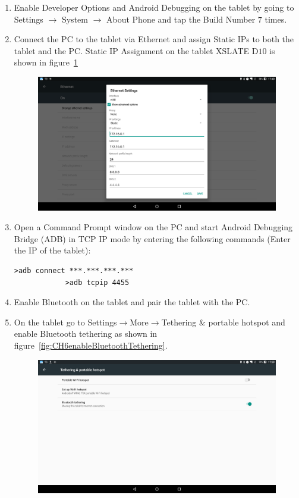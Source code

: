 \begin{enumerate}
	\item Enable Developer Options and Android Debugging on the tablet by going to Settings $\to$ System $\to$ About Phone and tap the Build Number $7$ times.
%
	\item Connect the PC to the tablet via Ethernet and assign Static IPs to both the tablet and the PC. Static IP Assignment on the tablet XSLATE D$10$ is shown in figure~\ref{fig:CH6staticIPAssign}
		\begin{figure}[h]
			\centering
			\includegraphics[height=0.3\textheight]{fig06/staticIpAssignTab.png}
			\label{fig:CH6staticIPAssign}
		\end{figure}
%
	\item Open a Command Prompt window on the PC and start Android Debugging Bridge (ADB) in TCP IP mode by entering the following commands (Enter the IP of the tablet):
		\begin{lstlisting}[style=DOS]
			>adb connect ***.***.***.***
			>adb tcpip 4455
		\end{lstlisting}
%
	\item Enable Bluetooth on the tablet and pair the tablet with the PC.
%
	\item On the tablet go to Settings$\to$More$\to$Tethering \& portable hotspot and enable Bluetooth tethering as shown in figure~\ref{fig:CH6enableBluetoothTethering}.
		\begin{figure}[h]
			\centering
			\includegraphics[height=0.3\textheight]{fig06/BluetoothTetheringEnable.png}

\end{figure}
\end{enumerate}
